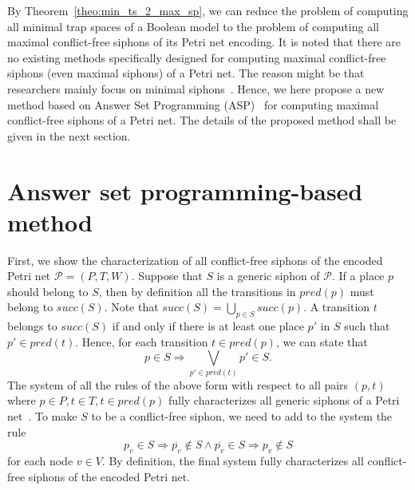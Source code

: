 \documentclass[runningheads]{llncs}
\begin{document}
By Theorem~\ref{theo:min_ts_2_max_sp}, we can reduce the problem of computing all minimal trap spaces of a Boolean model to the problem of computing all maximal conflict-free siphons of its Petri net encoding. It is noted that there are no existing methods specifically designed for computing maximal conflict-free siphons (even maximal siphons) of a Petri net. The reason might be that researchers mainly focus on minimal siphons~\cite{DBLP:journals/isci/LiuB16}. Hence, we here propose a new method based on Answer Set Programming (ASP)~\cite{DBLP:journals/aicom/GebserKKOSS11} for computing maximal conflict-free siphons of a Petri net. The details of the proposed method shall be given in the next section.

\section{Answer set programming-based method}
First, we show the characterization of all conflict-free siphons of the encoded Petri net \(\mathcal{P} = (P, T, W)\). Suppose that \(S\) is a generic siphon of \(\mathcal{P}\). If a place \(p\) should belong to \(S\), then by definition all the transitions in \(pred(p)\) must belong to \(succ(S)\). Note that \(succ(S) = \bigcup_{p \in S}succ(p)\). A transition \(t\) belongs to \(succ(S)\) if and only if there is at least one place \(p'\) in \(S\) such that \(p' \in pred(t)\). Hence, for each transition \(t \in pred(p)\), we can state that
\begin{equation}
\label{eq:siphon}
p \in S \Rightarrow \bigvee_{p' \in pred(t)}p' \in S.
\end{equation}
The system of all the rules of the above form with respect to all pairs \((p, t)\) where \(p \in P, t \in T, t \in pred(p)\) fully characterizes all generic siphons of a Petri net~\cite{nabli2016enumerating}.
To make \(S\) to be a conflict-free siphon, we need to add to the system the rule
\begin{equation}
\label{eq:conflict}
p_v \in S \Rightarrow \overline{p_v} \not \in S \wedge \overline{p_v} \in S \Rightarrow p_v \not \in S
\end{equation}for each node \(v \in V\).
By definition, the final system fully characterizes all conflict-free siphons of the encoded Petri net.
\end{document}

